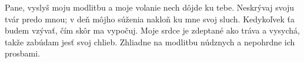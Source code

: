 Pane, vyslyš moju modlitbu
a moje volanie nech dôjde ku tebe.
\versseparator
Neskrývaj svoju tvár predo mnou;
v deň môjho súženia
nakloň ku mne svoj sluch.
\versseparator
Kedykoľvek ťa budem vzývať,
čím skôr ma vypočuj.
\versseparator
Moje srdce je zdeptané ako tráva a vysychá,
takže zabúdam jesť svoj chlieb.
\versseparator
Zhliadne na modlitbu núdznych
a nepohrdne ich prosbami.